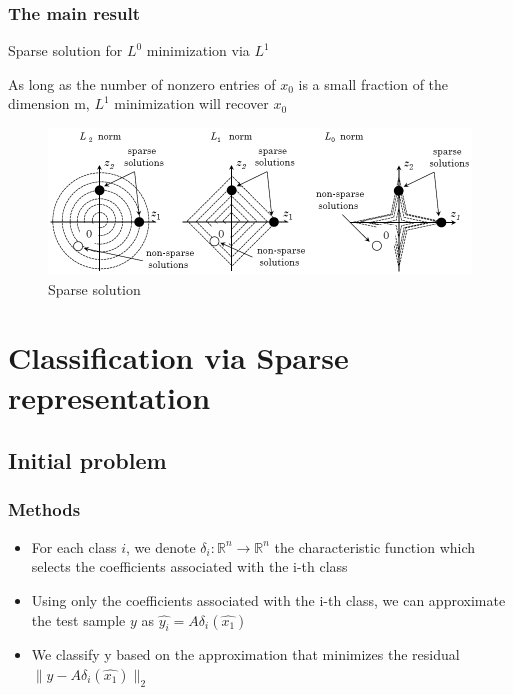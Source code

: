 \documentclass{beamer}
\begin{document}
\begin{frame}

		\frametitle{The main result}		
			
\begin{block}{Sparse solution for $L^{0}$ minimization via $L^{1}$}

As long as the number of nonzero entries of $x_{0}$ is a small fraction of the dimension m, $L^{1}$ minimization will recover $x_{0}$ 

\end{block}

			\begin{figure}[!ht]
			\begin{center}
			\includegraphics[scale=0.45]{sparse_sol.png}
			\end{center}
			\caption{Sparse solution}
			\label{fa}
			\end{figure}

\end{frame}


\section{Classification via Sparse representation}

\subsection{Initial problem}

\begin{frame}

\frametitle{Methods}


	\begin{itemize}
	
\item For each class $i$, we denote $\delta_{i} : \mathbb{R}^{n} \to \mathbb{R}^{n}$ the characteristic function which selects the coefficients associated with the i-th class

\item Using only the coefficients associated with the i-th class, we can approximate the test sample $y$ as $\hat{y_{i}}=A\delta_{i}(\hat{x_{1}})$
\item We classify y based on the approximation that minimizes the residual $\|y-A\delta_{i}(\hat{x_{1}})\|_{2}$

	\end{itemize}

\end{frame}
\end{document}
